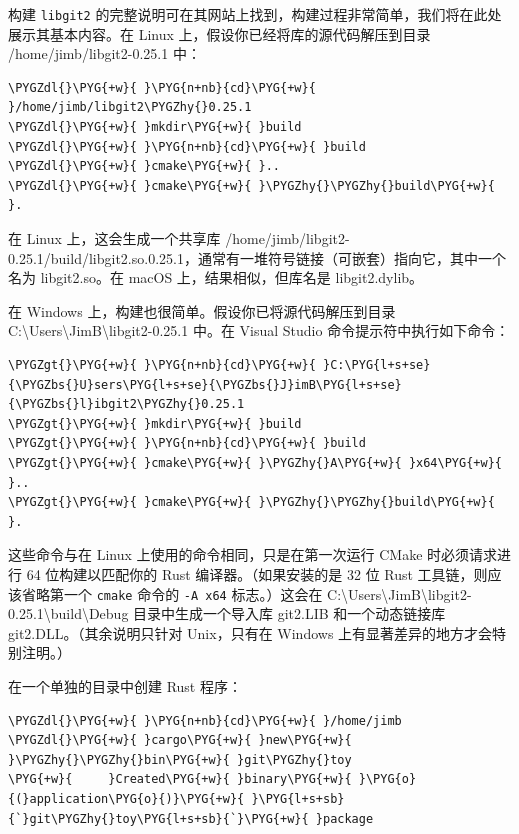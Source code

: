 构建 \texttt{libgit2} 的完整说明可在其网站上找到，构建过程非常简单，我们将在此处展示其基本内容。在 Linux 上，假设你已经将库的源代码解压到目录 /home/\allowbreak{}jimb/\allowbreak{}libgit2-0.25.1 中：

\begin{Verbatim}[commandchars=\\\{\},breaklines=true,breakanywhere=true,fontsize=\codefont,xleftmargin=17bp]
\PYGZdl{}\PYG{+w}{ }\PYG{n+nb}{cd}\PYG{+w}{ }/home/jimb/libgit2\PYGZhy{}0.25.1
\PYGZdl{}\PYG{+w}{ }mkdir\PYG{+w}{ }build
\PYGZdl{}\PYG{+w}{ }\PYG{n+nb}{cd}\PYG{+w}{ }build
\PYGZdl{}\PYG{+w}{ }cmake\PYG{+w}{ }..
\PYGZdl{}\PYG{+w}{ }cmake\PYG{+w}{ }\PYGZhy{}\PYGZhy{}build\PYG{+w}{ }.
\end{Verbatim}

在 Linux 上，这会生成一个共享库 /home/\allowbreak{}jimb/\allowbreak{}libgit2-0.25.1/\allowbreak{}build/\allowbreak{}libgit2.so.0.25.1，通常有一堆符号链接（可嵌套）指向它，其中一个名为 libgit2.so。在 macOS 上，结果相似，但库名是 libgit2.dylib。

在 Windows 上，构建也很简单。假设你已将源代码解压到目录 C:\textbackslash{}Users\textbackslash{}JimB\textbackslash{}libgit2-0.25.1 中。在 Visual Studio 命令提示符中执行如下命令：

\begin{Verbatim}[commandchars=\\\{\},breaklines=true,breakanywhere=true,fontsize=\codefont,xleftmargin=17bp]
\PYGZgt{}\PYG{+w}{ }\PYG{n+nb}{cd}\PYG{+w}{ }C:\PYG{l+s+se}{\PYGZbs{}U}sers\PYG{l+s+se}{\PYGZbs{}J}imB\PYG{l+s+se}{\PYGZbs{}l}ibgit2\PYGZhy{}0.25.1
\PYGZgt{}\PYG{+w}{ }mkdir\PYG{+w}{ }build
\PYGZgt{}\PYG{+w}{ }\PYG{n+nb}{cd}\PYG{+w}{ }build
\PYGZgt{}\PYG{+w}{ }cmake\PYG{+w}{ }\PYGZhy{}A\PYG{+w}{ }x64\PYG{+w}{ }..
\PYGZgt{}\PYG{+w}{ }cmake\PYG{+w}{ }\PYGZhy{}\PYGZhy{}build\PYG{+w}{ }.
\end{Verbatim}

这些命令与在 Linux 上使用的命令相同，只是在第一次运行 CMake 时必须请求进行 64 位构建以匹配你的 Rust 编译器。（如果安装的是 32 位 Rust 工具链，则应该省略第一个 \texttt{cmake} 命令的 \texttt{-A x64} 标志。）这会在 C:\textbackslash{}Users\textbackslash{}JimB\textbackslash{}libgit2-0.25.1\textbackslash{}build\textbackslash{}Debug 目录中生成一个导入库 git2.LIB 和一个动态链接库 git2.DLL。（其余说明只针对 Unix，只有在 Windows 上有显著差异的地方才会特别注明。）

在一个单独的目录中创建 Rust 程序：

\begin{Verbatim}[commandchars=\\\{\},breaklines=true,breakanywhere=true,fontsize=\codefont,xleftmargin=17bp]
\PYGZdl{}\PYG{+w}{ }\PYG{n+nb}{cd}\PYG{+w}{ }/home/jimb
\PYGZdl{}\PYG{+w}{ }cargo\PYG{+w}{ }new\PYG{+w}{ }\PYGZhy{}\PYGZhy{}bin\PYG{+w}{ }git\PYGZhy{}toy
\PYG{+w}{     }Created\PYG{+w}{ }binary\PYG{+w}{ }\PYG{o}{(}application\PYG{o}{)}\PYG{+w}{ }\PYG{l+s+sb}{`}git\PYGZhy{}toy\PYG{l+s+sb}{`}\PYG{+w}{ }package
\end{Verbatim}

